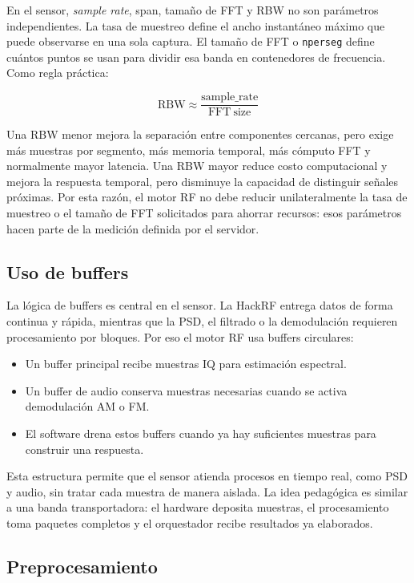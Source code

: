 En el sensor, \textit{sample rate}, span, tamaño de FFT y RBW no son parámetros
independientes. La tasa de muestreo define el ancho instantáneo máximo que puede
observarse en una sola captura. El tamaño de FFT o \texttt{nperseg} define cuántos
puntos se usan para dividir esa banda en contenedores de frecuencia. Como regla
práctica:

\[
\mathrm{RBW} \approx \frac{\mathrm{sample\_rate}}{\mathrm{FFT\ size}}
\]

Una RBW menor mejora la separación entre componentes cercanas, pero exige más
muestras por segmento, más memoria temporal, más cómputo FFT y normalmente mayor
latencia. Una RBW mayor reduce costo computacional y mejora la respuesta temporal,
pero disminuye la capacidad de distinguir señales próximas. Por esta razón, el
motor RF no debe reducir unilateralmente la tasa de muestreo o el tamaño de FFT
solicitados para ahorrar recursos: esos parámetros hacen parte de la medición
definida por el servidor.

\subsection{Uso de buffers}

La lógica de buffers es central en el sensor. La HackRF entrega datos de forma
continua y rápida, mientras que la PSD, el filtrado o la demodulación requieren
procesamiento por bloques. Por eso el motor RF usa buffers circulares:

\begin{itemize}
  \item Un buffer principal recibe muestras IQ para estimación espectral.
  \item Un buffer de audio conserva muestras necesarias cuando se activa
  demodulación AM o FM.
  \item El software drena estos buffers cuando ya hay suficientes muestras para
  construir una respuesta.
\end{itemize}

Esta estructura permite que el sensor atienda procesos en tiempo real, como PSD y
audio, sin tratar cada muestra de manera aislada. La idea pedagógica es similar a
una banda transportadora: el hardware deposita muestras, el procesamiento toma
paquetes completos y el orquestador recibe resultados ya elaborados.

\subsection{Preprocesamiento}

